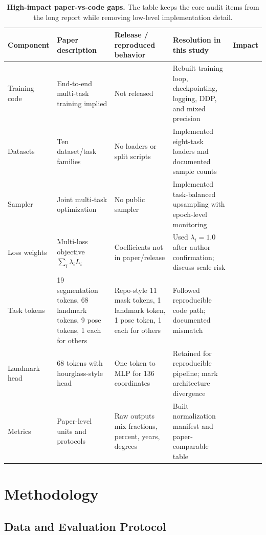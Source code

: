 \begin{table}[!t]
\caption{\textbf{High-impact paper-vs-code gaps.} The table keeps the core audit items from the long report while removing low-level implementation detail.}
\label{tab:gaps}
\centering
\scriptsize
\setlength{\tabcolsep}{3pt}
\begin{tabularx}{\textwidth}{p{}YYYp{0.09\textwidth}}
\toprule
Component & Paper description & Release / reproduced behavior & Resolution in this study & Impact \\
\midrule
Training code & End-to-end multi-task training implied & Not released & Rebuilt training loop, checkpointing, logging, DDP, and mixed precision &  \\
Datasets & Ten dataset/task families & No loaders or split scripts & Implemented eight-task loaders and documented sample counts &  \\
Sampler & Joint multi-task optimization & No public sampler & Implemented task-balanced upsampling with epoch-level monitoring &  \\
Loss weights & Multi-loss objective $\sum_i \lambda_i L_i$ & Coefficients not in paper/release & Used $\lambda_i=1.0$ after author confirmation; discuss scale risk &  \\
Task tokens & 19 segmentation tokens, 68 landmark tokens, 9 pose tokens, 1 each for others & Repo-style 11 mask tokens, 1 landmark token, 1 pose token, 1 each for others & Followed reproducible code path; documented mismatch &  \\
Landmark head & 68 tokens with hourglass-style head & One token to MLP for 136 coordinates & Retained for reproducible pipeline; mark architecture divergence &  \\
Metrics & Paper-level units and protocols & Raw outputs mix fractions, percent, years, degrees & Built normalization manifest and paper-comparable table &  \\
\bottomrule
\end{tabularx}
\end{table}

\section{Methodology}

\subsection{Data and Evaluation Protocol}

